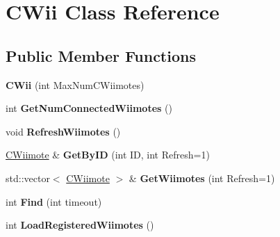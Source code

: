 \hypertarget{class_c_wii}{\section{C\-Wii Class Reference}
\label{class_c_wii}
}
\subsection*{Public Member Functions}
\begin{DoxyCompactItemize}
\item 
\hypertarget{class_c_wii_af61aa748b5c06d551d2e0ca4254f815d}{{\bfseries C\-Wii} (int Max\-Num\-C\-Wiimotes)}\label{class_c_wii_af61aa748b5c06d551d2e0ca4254f815d}

\item 
\hypertarget{class_c_wii_a0e0000682a9469cabc60b6107631fec8}{int {\bfseries Get\-Num\-Connected\-Wiimotes} ()}\label{class_c_wii_a0e0000682a9469cabc60b6107631fec8}

\item 
\hypertarget{class_c_wii_a1ad5ec6adb3939eb2bda5596fb7d6f4a}{void {\bfseries Refresh\-Wiimotes} ()}\label{class_c_wii_a1ad5ec6adb3939eb2bda5596fb7d6f4a}

\item 
\hypertarget{class_c_wii_aed6eb96fc61d08154aee79852def620c}{\hyperlink{class_c_wiimote}{C\-Wiimote} \& {\bfseries Get\-By\-I\-D} (int I\-D, int Refresh=1)}\label{class_c_wii_aed6eb96fc61d08154aee79852def620c}

\item 
\hypertarget{class_c_wii_a9d3c9500516e13b496f22e1e2a1ca44e}{std\-::vector$<$ \hyperlink{class_c_wiimote}{C\-Wiimote} $>$ \& {\bfseries Get\-Wiimotes} (int Refresh=1)}\label{class_c_wii_a9d3c9500516e13b496f22e1e2a1ca44e}

\item 
\hypertarget{class_c_wii_aee1843485afecca45a788df92a56941f}{int {\bfseries Find} (int timeout)}\label{class_c_wii_aee1843485afecca45a788df92a56941f}

\item 
\hypertarget{class_c_wii_acbf1b4f880bf41293e44679cff430794}{int {\bfseries Load\-Registered\-Wiimotes} ()}\label{class_c_wii_acbf1b4f880bf41293e44679cff430794}


\end{DoxyCompactItemize}

